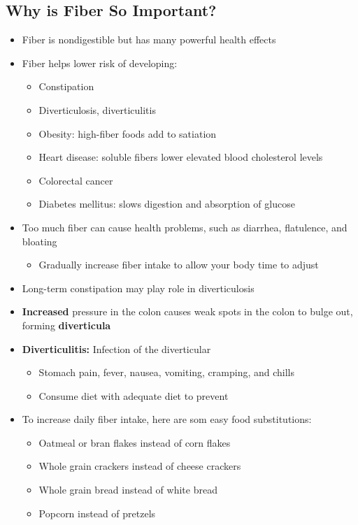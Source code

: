 \documentclass[12pt]{article}
\begin{document}
        \subsection{Why is Fiber So Important?}
            \begin{itemize}
                \item Fiber is nondigestible but has many powerful health effects
                \item Fiber helps lower risk of developing:
                    \begin{itemize}
                        \item Constipation
                        \item Diverticulosis, diverticulitis
                        \item Obesity: high-fiber foods add to satiation
                        \item Heart disease: soluble fibers lower elevated blood cholesterol levels
                        \item Colorectal cancer
                        \item Diabetes mellitus: slows digestion and absorption of glucose
                    \end{itemize}
                \item Too much fiber can cause health problems, such as diarrhea, flatulence, and bloating
                    \begin{itemize}
                        \item Gradually increase fiber intake to allow your body time to adjust
                    \end{itemize}
                \item Long-term constipation may play role in diverticulosis
                \item \textbf{Increased} pressure in the colon causes weak spots in the colon to bulge out, forming \textbf{diverticula}
                \item \textbf{Diverticulitis:} Infection of the diverticular
                    \begin{itemize}
                        \item Stomach pain, fever, nausea, vomiting, cramping, and chills
                        \item Consume diet with adequate diet to prevent
                    \end{itemize}
                \item To increase daily fiber intake, here are som easy food substitutions:
                    \begin{itemize}
                        \item Oatmeal or bran flakes instead of corn flakes
                        \item Whole grain crackers instead of cheese crackers
                        \item Whole grain bread instead of white bread
                        \item Popcorn instead of pretzels
                    \end{itemize}
            \end{itemize}
    
\end{document}
